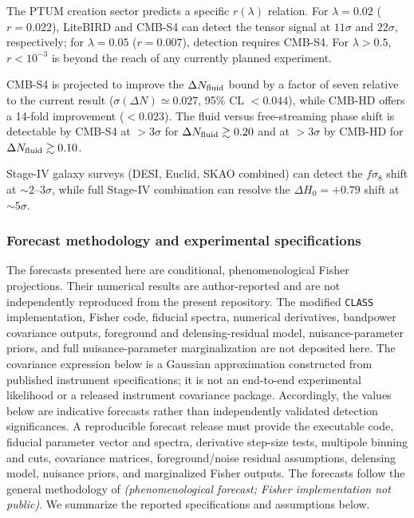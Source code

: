 \documentclass[epj]{svjour}
\begin{document}
The PTUM creation sector predicts a specific \(r(\lambda)\)
relation. For \(\lambda=0.02\) (\(r=0.022\)), LiteBIRD and CMB-S4
can detect the tensor signal at \(11\sigma\) and \(22\sigma\),
respectively; for \(\lambda=0.05\) (\(r=0.007\)), detection
requires CMB-S4. For \(\lambda>0.5\), \(r<10^{-3}\) is beyond
the reach of any currently planned experiment.

CMB-S4 is projected to improve the \(\Delta N_{\rm fluid}\) bound
by a factor of seven relative to the current result
(\(\sigma(\Delta N)\simeq0.027\), 95\% CL \(<0.044\)), while
CMB-HD offers a 14-fold improvement (\(<0.023\)). The fluid
versus free-streaming phase shift is detectable by CMB-S4 at
\(>3\sigma\) for \(\Delta N_{\rm fluid}\gtrsim0.20\) and at
\(>3\sigma\) by CMB-HD for \(\Delta N_{\rm fluid}\gtrsim0.10\).

Stage-IV galaxy surveys (DESI, Euclid, SKAO combined) can detect
the \(f\sigma_8\) shift at \(\sim2\)--\(3\sigma\), while full
Stage-IV combination can resolve the \(\Delta H_0=+0.79\) shift
at \(\sim5\sigma\).

\subsubsection{Forecast methodology and experimental specifications}
\label{sec:forecast_methodology}

The forecasts presented here are conditional, phenomenological
Fisher projections. Their numerical results are author-reported and
are not independently reproduced from the present repository. The
modified \texttt{CLASS} implementation, Fisher code, fiducial spectra,
numerical derivatives, bandpower covariance outputs, foreground and
delensing-residual model, nuisance-parameter priors, and full
nuisance-parameter marginalization are not deposited here. The
covariance expression below is a Gaussian approximation constructed
from published instrument specifications; it is not an end-to-end
experimental likelihood or a released instrument covariance package.
Accordingly, the values below are indicative forecasts rather than
independently validated detection significances. A reproducible
forecast release must provide the executable code, fiducial parameter
vector and spectra, derivative step-size tests, multipole binning and
cuts, covariance matrices, foreground/noise residual assumptions,
delensing model, nuisance priors, and marginalized Fisher outputs.
The forecasts follow the general methodology of
\cite{Abazajian2016,Abazajian2019,Sehgal2019}
\emph{(phenomenological forecast; Fisher implementation not public)}.
We summarize the reported specifications and assumptions below.
\end{document}
